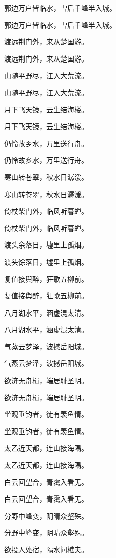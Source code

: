 \documentclass[12pt, a4paper, addpoints]{exam}
\begin{document}
\begin{questions}
\question[3] 郭边万户皆临水，雪后千峰半入城。

\question[3] 郭边万户皆临水，雪后千峰半入城。

\question[3] 渡远荆门外，来从楚国游。

\question[3] 渡远荆门外，来从楚国游。

\question[3] 山随平野尽，江入大荒流。

\question[3] 山随平野尽，江入大荒流。

\question[3] 月下飞天镜，云生结海楼。

\question[3] 月下飞天镜，云生结海楼。

\question[3] 仍怜故乡水，万里送行舟。

\question[3] 仍怜故乡水，万里送行舟。

\question[3] 寒山转苍翠，秋水日潺湲。

\question[3] 寒山转苍翠，秋水日潺湲。

\question[3] 倚杖柴门外，临风听暮蝉。

\question[3] 倚杖柴门外，临风听暮蝉。

\question[3] 渡头余落日，墟里上孤烟。

\question[3] 渡头馀落日，墟里上孤烟。

\question[3] 复值接舆醉，狂歌五柳前。

\question[3] 复值接舆醉，狂歌五柳前。

\question[3] 八月湖水平，涵虚混太清。

\question[3] 八月湖水平，涵虚混太清。

\question[3] 气蒸云梦泽，波撼岳阳城。

\question[3] 气蒸云梦泽，波撼岳阳城。

\question[3] 欲济无舟楫，端居耻圣明。

\question[3] 欲济无舟楫，端居耻圣明。

\question[3] 坐观垂钓者，徒有羡鱼情。

\question[3] 坐观垂钓者，徒有羡鱼情。

\question[3] 太乙近天都，连山接海隅。

\question[3] 太乙近天都，连山接海隅。

\question[3] 白云回望合，青霭入看无。

\question[3] 白云回望合，青霭入看无。

\question[3] 分野中峰变，阴晴众壑殊。

\question[3] 分野中峰变，阴晴众壑殊。

\question[3] 欲投人处宿，隔水问樵夫。


\end{questions}
\end{document}
